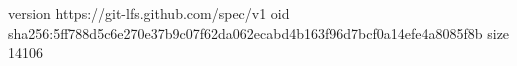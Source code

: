 version https://git-lfs.github.com/spec/v1
oid sha256:5ff788d5c6e270e37b9c07f62da062ecabd4b163f96d7bcf0a14efe4a8085f8b
size 14106
